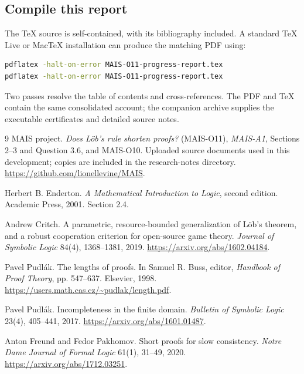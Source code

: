 \documentclass[11pt]{article}
\theoremstyle{definition}
\theoremstyle{remark}
\begin{document}
\subsection{Compile this report}
The TeX source is self-contained, with its bibliography included. A standard
TeX Live or MacTeX installation can produce the matching PDF using:
\begin{lstlisting}[language=bash]
pdflatex -halt-on-error MAIS-O11-progress-report.tex
pdflatex -halt-on-error MAIS-O11-progress-report.tex
\end{lstlisting}
Two passes resolve the table of contents and cross-references. The PDF and
TeX contain the same consolidated account; the companion archive supplies
the executable certificates and detailed source notes.

\clearpage
{}
{}
\begin{thebibliography}{9}
MAIS project. \emph{Does L\"ob's rule shorten proofs?} (MAIS-O11),
\emph{MAIS-A1}, Sections 2--3 and Question 3.6, and MAIS-O10.
Uploaded source documents used in this development; copies are included in
the research-notes directory.
\url{https://github.com/lionellevine/MAIS}.

Herbert B. Enderton. \emph{A Mathematical Introduction to Logic},
second edition. Academic Press, 2001. Section 2.4.

Andrew Critch. A parametric, resource-bounded generalization of L\"ob's
theorem, and a robust cooperation criterion for open-source game theory.
\emph{Journal of Symbolic Logic} 84(4), 1368--1381, 2019.
\url{https://arxiv.org/abs/1602.04184}.

Pavel Pudl\'ak. The lengths of proofs. In Samuel R. Buss, editor,
\emph{Handbook of Proof Theory}, pp. 547--637. Elsevier, 1998.
\url{https://users.math.cas.cz/~pudlak/length.pdf}.

Pavel Pudl\'ak. Incompleteness in the finite domain.
\emph{Bulletin of Symbolic Logic} 23(4), 405--441, 2017.
\url{https://arxiv.org/abs/1601.01487}.

Anton Freund and Fedor Pakhomov. Short proofs for slow consistency.
\emph{Notre Dame Journal of Formal Logic} 61(1), 31--49, 2020.
\url{https://arxiv.org/abs/1712.03251}.
\end{thebibliography}
\end{document}
